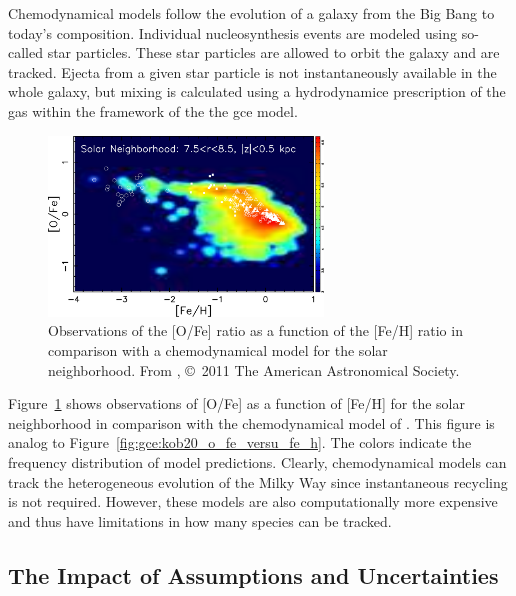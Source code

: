 Chemodynamical models follow the evolution of a galaxy from the Big Bang to today's composition. Individual nucleosynthesis events are modeled using so-called star particles. These star particles are allowed to orbit the galaxy and are tracked. Ejecta from a given star particle is not instantaneously available in the whole galaxy, but mixing is calculated using a hydrodynamice prescription of the gas within the framework of the the \ac{gce} model. 

\begin{figure}[tb]
    \centering
    \includegraphics[width=0.65\textwidth]{graphics/gce/kobayashi11_fig10a}
    \caption{Observations of the [O/Fe] ratio as a function of the [Fe/H] ratio in comparison with a chemodynamical model for the solar neighborhood. From \citet{kobayashi11}, \copyright\ 2011 The American Astronomical Society.}
    \label{fig:gce:kob11_o_fe_versus_fe_h}
\end{figure}
Figure~\ref{fig:gce:kob11_o_fe_versus_fe_h} shows observations of [O/Fe] as a function of [Fe/H] for the solar neighborhood in comparison with the chemodynamical model of \citet{kobayashi11}. This figure is analog to Figure~\ref{fig:gce:kob20_o_fe_versu_fe_h}. The colors indicate the frequency distribution of model predictions. Clearly, chemodynamical models can track the heterogeneous evolution of the Milky Way since instantaneous recycling is not required. However, these models are also computationally more expensive and thus have limitations in how many species can be tracked.


\subsection{The Impact of Assumptions and Uncertainties}

